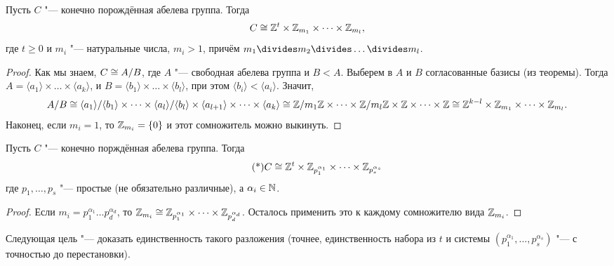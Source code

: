 \documentclass[main]{subfiles}
\begin{document}
\begin{corollary}
  Пусть \( C \) "--- конечно порождённая абелева группа. Тогда
  \[
    C \cong \mathbb{Z}^t \times \mathbb{Z}_{m_1} \times
  \dots \times \mathbb{Z}_{m_l},
  \]
  где \(t \ge 0 \)
  и \( m_i \) "--- натуральные числа,
  \( m_i > 1 \),
  причём \( m_1 \divides m_2 \divides \dots \divides m_l \).
\end{corollary}
\begin{proof}
  Как мы знаем, \( C \cong \Factor{A}[B] \), где
  \( A \) "--- свободная абелева группа и \( B < A \).
  Выберем в \( A \) и \( B \) согласованные базисы (из теоремы).
  Тогда \( A = \langle a_1 \rangle \times \dots \times
  \langle a_k \rangle \), и \( B = \langle b_1 \rangle \times \dots \times
  \langle b_l \rangle \), при этом \( \langle b_i \rangle < \langle a_i \rangle \).
  Значит,
  \[
    \Factor{A}[B] \cong \Factor{\langle a_1 \rangle}[\langle b_1 \rangle]
    \times \dots \times \Factor{\langle a_l \rangle}[\langle b_l \rangle]
    \times \langle a_{l+1} \rangle \times \dots \times \langle a_k \rangle
    \cong \Factor{\Integer}[m_1 \Integer]
    \times \dots \times \Factor{\Integer}[m_l \Integer]
    \times \Integer \times \dots \times \Integer \cong
    \Integer^{k - l} \times \Integer_{m_1} \times \dots \times \Integer_{m_l}.
  \]
  Наконец, если \( m_i = 1 \), то \( \mathbb{Z}_{m_i} = \{ 0 \} \) и этот
  сомножитель можно выкинуть.
\end{proof}
\begin{corollary}
  Пусть \( C \) "--- конечно порждённая абелева группа.
  Тогда
  \begin{equation}\label{abel-structure} \tag{*}
    C \cong \mathbb{Z}^t \times \mathbb{Z}_{p_1^{\alpha_1}} \times
    \dots \times \mathbb{Z}_{p_s^{\alpha_s}}
  \end{equation}
  где \( p_1, \dots, p_s \) "--- простые (не обязательно различные),
  а \( \alpha_i \in \mathbb{N} \).
\end{corollary}
\begin{proof}
  Если \( m_i = p_1^{\alpha_1} \dots p_d^{\alpha_d} \),
  то \( \mathbb{Z}_{m_i} \cong \mathbb{Z}_{p_1^{\alpha_1}} \times
  \dots \times \mathbb{Z}_{p_d^{\alpha_d}} \).
  Осталось применить это к каждому сомножителю
  вида \( \mathbb{Z}_{m_i} \).
\end{proof}

Следующая цель "--- доказать единственность такого разложения
(точнее, единственность набора из \( t \) и системы
\( (p_1^{\alpha_1}, \dots, p_s^{\alpha_s}) \) "--- с точностью
до перестановки).
\end{document}
